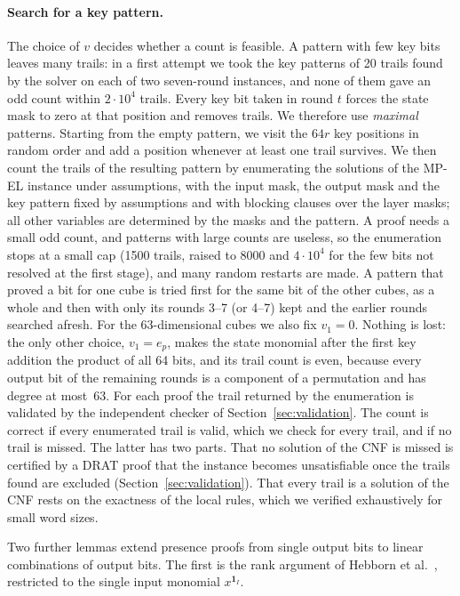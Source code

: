 \documentclass[pdflatex,sn-mathphys-num]{sn-jnl}
\theoremstyle{thmstyleone}
\theoremstyle{thmstylethree}
\theoremstyle{thmstyletwo}
\newcommand{\MPEL}{\textsf{MP-EL}}
\begin{document}
\paragraph{Search for a key pattern.} The choice of $v$ decides whether a count is feasible. A pattern with few key bits leaves many trails: in a first attempt we took the key patterns of 20 trails found by the solver on each of two seven-round instances, and none of them gave an odd count within $2\cdot10^4$ trails. Every key bit taken in round $t$ forces the state mask to zero at that position and removes trails. We therefore use \emph{maximal} patterns. Starting from the empty pattern, we visit the $64r$ key positions in random order and add a position whenever at least one trail survives. We then count the trails of the resulting pattern by enumerating the solutions of the \MPEL{} instance under assumptions, with the input mask, the output mask and the key pattern fixed by assumptions and with blocking clauses over the layer masks; all other variables are determined by the masks and the pattern. A proof needs a small odd count, and patterns with large counts are useless, so the enumeration stops at a small cap (1500 trails, raised to 8000 and $4\cdot10^4$ for the few bits not resolved at the first stage), and many random restarts are made. A pattern that proved a bit for one cube is tried first for the same bit of the other cubes, as a whole and then with only its rounds 3--7 (or 4--7) kept and the earlier rounds searched afresh. For the 63-dimensional cubes we also fix $v_1=0$. Nothing is lost: the only other choice, $v_1=e_p$, makes the state monomial after the first key addition the product of all 64 bits, and its trail count is even, because every output bit of the remaining rounds is a component of a permutation and has degree at most~63. For each proof the trail returned by the enumeration is validated by the independent checker of Section~\ref{sec:validation}. The count is correct if every enumerated trail is valid, which we check for every trail, and if no trail is missed. The latter has two parts. That no solution of the CNF is missed is certified by a DRAT proof that the instance becomes unsatisfiable once the trails found are excluded (Section~\ref{sec:validation}). That every trail is a solution of the CNF rests on the exactness of the local rules, which we verified exhaustively for small word sizes.

Two further lemmas extend presence proofs from single output bits to linear combinations of output bits. The first is the rank argument of Hebborn et al.~\cite{hebborn2021}, restricted to the single input monomial $x^{\mathbf 1_I}$.
\end{document}

